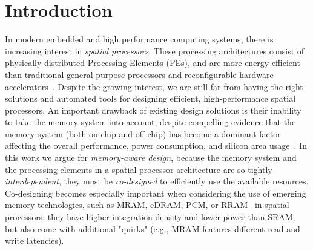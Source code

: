 \vspace{-2mm}
\section{Introduction}
In modern embedded and high performance computing systems, there is increasing interest in \textit{spatial processors}. These processing architectures consist of physically distributed Processing Elements (PEs), and are more energy efficient than traditional general purpose processors and reconfigurable hardware accelerators~\cite{parashar2014efficient,streamproc2019,8686088}. %
Despite the growing interest, we are still far from having the right  solutions and automated tools for designing efficient, high-performance spatial processors. An important drawback of existing design solutions is their inability to take the memory system into account, despite compelling evidence that the memory system (both on-chip and off-chip) has become a dominant factor affecting the overall performance, power consumption, and silicon area usage~\cite{williams2009roofline,dayarathna2015data,oh2009analytical}.
In this work we argue for \textit{memory-aware design}, because the memory system and the processing elements in a spatial processor architecture are so tightly \textit{interdependent}, they must be \textit{co-designed} to efficiently use the available resources. Co-designing becomes especially important when considering the use of emerging memory technologies, such as MRAM, eDRAM, PCM, or RRAM~\cite{mem2016} in spatial processors: they have higher integration density and lower power than SRAM, but also come with additional "quirks" (e.g., MRAM features different read and write latencies).

%

